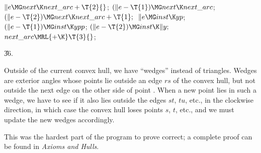 ${}\|e\MG\\{next}\K\\{next\_arc}+\T{2}{}$;\5
${}(\|e-\T{1})\MG\\{next}\K\\{next\_arc}{}$;\5
${}(\|e-\T{2})\MG\\{next}\K\\{next\_arc}+\T{1};{}$\6
${}\|e\MG\\{inst}\K\\{yp}{}$;\5
${}(\|e-\T{1})\MG\\{inst}\K\\{ypp}{}$;\5
${}(\|e-\T{2})\MG\\{inst}\K\|y;{}$\6
${}\\{next\_arc}\MRL{+{\K}}\T{3}{}$;\par
\U36.\fi

Outside of the current convex hull, we have ``wedges'' instead of
triangles. Wedges are exterior angles whose points lie outside an
edge $rs$ of the convex hull, but not outside the next edge on the other
side of point . When a new point lies in such a wedge, we have to
see if it also lies outside the edges $st$, $tu$, etc., in the
clockwise direction, in which case the convex hull loses points
$s$, $t$, etc., and we must update the new wedges accordingly.

This was the hardest part of the program to prove correct; a complete
proof can be found in {\sl Axioms and Hulls}.

